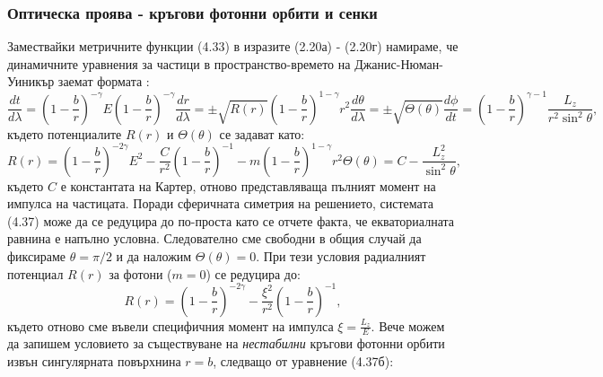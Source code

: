 \subsubsection{Оптическа проява - кръгови фотонни орбити и сенки}
Замествайки метричните функции (4.33) в изразите (2.20а) - (2.20г) намираме, че динамичните уравнения за частици в пространство-времето на Джанис-Нюман-Уиникър заемат формата \cite{Gyulchev2020}:
\begin{subequations}
	\begin{equation}
		\frac{dt}{d\lambda} = \left(1 - \frac{b}{r}\right)^{-\gamma}E
	\end{equation}
	\begin{equation}
		\left(1 - \frac{b}{r}\right)^{-\gamma}\frac{dr}{d\lambda} = \pm\sqrt{R(r)}
	\end{equation}
	\begin{equation}
		\left(1 - \frac{b}{r}\right)^{1 - \gamma}r^2\frac{d\theta}{d\lambda} = \pm \sqrt{\Theta(\theta)}
	\end{equation}
	\begin{equation}
		\frac{d\phi}{dt} = \left(1 - \frac{b}{r}\right)^{\gamma-1}\frac{L_z}{r^2\sin^2\theta},
	\end{equation}
\end{subequations}
където потенциалите $R(r)$ и $\Theta(\theta)$ се задават като:
\begin{subequations}
	\begin{equation}
		R(r) = \left(1 - \frac{b}{r}\right)^{-2\gamma}E^2 - \frac{C}{r^2}\left(1 - \frac{b}{r}\right)^{-1} - m\left(1 - \frac{b}{r}\right)^{1 - \gamma}r^2
	\end{equation}
	\begin{equation}
		\Theta(\theta) = C - \frac{L_z^2}{\sin^2\theta},
	\end{equation}
\end{subequations}
където $C$ е константата на Картер, отново представляваща пълният момент на импулса на частицата. Поради сферичната симетрия на решението, системата (4.37) може да се редуцира до по-проста като се отчете факта, че екваториалната равнина е напълно условна. Следователно сме свободни в общия случай да фиксираме $\theta = \pi / 2$ и да наложим $\Theta(\theta) = 0$. При тези условия радиалният потенциал $R(r)$ за фотони ($m = 0$) се редуцира до:
\begin{equation}
	R(r) = \left(1 - \frac{b}{r}\right)^{-2\gamma} - \frac{\xi^2}{r^2}\left(1 - \frac{b}{r}\right)^{-1} ,
\end{equation}
където отново сме въвели специфичния момент на импулса $\xi = \frac{L_z}{E}$. Вече можем да запишем условието за съществуване на \emph{нестабилни} кръгови фотонни орбити извън сингулярната повърхнина $r = b$, следващо от уравнение (4.37б):

